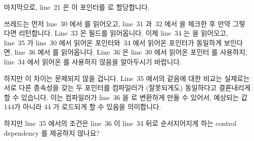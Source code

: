 마지막으로, line~21 은 이 포인터를  로 할당합니다.

 쓰레드는 먼저 line~30 에서  를 읽어오고, line~31 과~32
에서  을 체크한 후 만약 그렇다면 리턴합니다.
Line~33 은  필드를 읽어옵니다.
이제 line~34 는  을 읽어오고, line~35 가 line~30 에서 읽어온
포인터와~34 에서 읽어온 포인터가 동일하게 보인다면, line~36 에서  를
읽어옵니다.
Line~36 은 line~30 에서 읽어온 포인터  를 사용하지, line~34 에서 읽어온
 를 사용하지 않음을 알아두시기 바랍니다.

하지만 이 차이는 문제되지 않을 겁니다.
Line~35 에서의 같음에 대한 비교는 실제로는 서로 다른 종속성을 갖는 두 포인터를
컴파일러가 (잘못되게도) 동일하다고 결론내리게 할 수 있습니다.
이는 컴파일러가 line~36 을  로 변환하게 만들 수 있어서, 예상되는
값 144가 아니라 44 가 로드되게 할 수 있음을 의미합니다.

\QuickQuiz{}
	하지만 line~35 에서의 조건은 line~36 이 line~34 뒤로 순서지어지게 하는
	control dependency 를 제공하지 않나요?
	\iffalse

